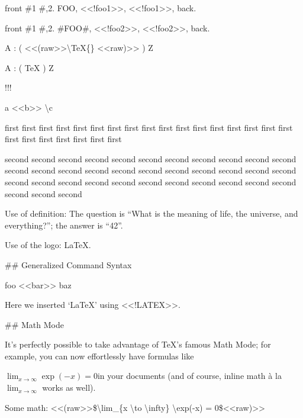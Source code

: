 
\begin{multicols}{2}front \#1 \#,2. FOO, <<!foo1>>, <<!foo1>>, back.\mktsShowpar\par
front \#1 \#,2. \#FOO\#, <<!foo2>>, <<!foo2>>, back.\mktsShowpar\par
A : ( <<(raw>>\textbackslash{}TeX\{\} <<raw)>> ) Z\mktsShowpar\par
A : ( \TeX{}  ) Z\mktsShowpar\par
[first value]\mktsShowpar\par
[second value]\mktsShowpar\par
[second value]!!!\mktsShowpar\par
a <<b>> \textbackslash{}c\mktsShowpar\par





\mktsShowpar\par
first first first first first first
first first first first first first first first first
first first first first first first first first first\mktsShowpar\par
second second second second second second second second second
second second second second second second second second second
second second second second second second second second second
second second second second second second second second second
\mktsShowpar\par
Use of definition: The question is “{\mktsStyleItalic{}What is the meaning of life,
the universe, and everything?\/}”; the
answer is “{\mktsStyleBold{}42}”.\mktsShowpar\par
\end{multicols}Use of the logo: \LaTeX{}.\mktsShowpar\par
\#\# Generalized Command Syntax\mktsShowpar\par
foo <<bar>> baz\mktsShowpar\par
Here we inserted ‘\LaTeX{}’ using {\mktsStyleCode{}<<!LATEX>>}.\mktsShowpar\par
\begin{multicols}{2}\#\# Math Mode\mktsShowpar\par
It’s perfectly possible to take advantage of
\TeX{}'s famous Math Mode; for example,
you can now effortlessly have formulas like\mktsShowpar\par
$\lim_{x \to \infty} \exp(-x) = 0$in your documents (and of course, inline math {\mktsStyleItalic{}à la\/}
$\lim_{x \to \infty}$ works as well).\mktsShowpar\par
\end{multicols}Some math: {\mktsStyleCode{}<<(raw>>\$\textbackslash{}lim\_\{x \textbackslash{}to \textbackslash{}infty\} \textbackslash{}exp(-x) = 0\$<<raw)>>}\mktsShowpar\par
